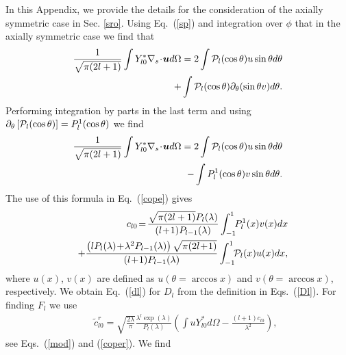 \documentclass[aps,prx,twocolumn,amsmath,amssymb,amsfonts]{revtex4-2}
\begin{document}
{{\begin{appendices}
In this Appendix, we provide the details for the consideration of the axially symmetric case in Sec. \ref{sro}. Using Eq.~(\ref{sp}) and integration over $\phi$ that in the axially symmetric case we find that
\begin{eqnarray}&&\!\!\!\!\!\!
\frac{1}{\sqrt{\pi(2l+1)}}\int  Y_{l0}^* \nabla_s\!\cdot\!\bm u d\Omega=2\int  {\cal P}_l(\cos\theta)  u \sin\theta d\theta
\nonumber\\&&\!\!\!\!\!\!
+\int  {\cal P}_l(\cos\theta) \partial_{\theta}(\sin\theta v) d\theta.
\end{eqnarray}
Performing integration by parts in the last term and using $ \partial_{\theta}\left[{\cal P}_l(\cos\theta) \right]=P_l^1(\cos\theta)$ we find
\begin{eqnarray}&&\!\!\!\!\!\!
\frac{1}{\sqrt{\pi(2l+1)}}\int  Y_{l0}^* \nabla_s\!\cdot\!\bm u d\Omega=2\int  {\cal P}_l(\cos\theta)  u \sin\theta d\theta
\nonumber\\&&\!\!\!\!\!\!
-\int  P_l^1(\cos\theta) v \sin\theta d\theta.
\end{eqnarray}
The use of this formula in Eq.~(\ref{cope}) gives
\begin{eqnarray}&&
c_{l0}\!=\! \frac{\sqrt{\pi(2l+1)} P_l(\lambda)}{(l\!+\!1) P_{l-1}(\lambda)}\int_{-1}^1\!\!  P_l^1(x)  v(x) dx
\\&&
+\frac{\left(l P_l(\lambda)
\!+\!\lambda^2 P_{l-1}(\lambda)\right)\sqrt{\pi(2l\!+\!1)}}{(l\!+\!1) P_{l-1}(\lambda)} \int_{-1}^1\!\!  {\cal P}_l(x)  u(x) dx,\nonumber
\end{eqnarray}
where $u(x)$, $v(x)$ are defined as $u(\theta=\arccos x)$ and $v(\theta=\arccos x)$, respectively. We obtain Eq.~(\ref{dl}) for $D_l$ from the definition in Eqs.~(\ref{Dl}).
For finding $F_l$ we use
\begin{eqnarray}&&
{\tilde c}^{r}_{l0}\!=\!\sqrt{\frac{2\lambda}{\pi}}
\frac{\lambda^l\exp\left(\lambda\right)}{P_l(\lambda)}\left(\int\! u Y_{l0}^* d\Omega-\frac{(l\!+\!1)c_{l0}}{\lambda^2}\right),
\end{eqnarray}
see Eqs.~(\ref{mod}) and (\ref{coper}). We find

\end{appendices}}}
\end{document}
